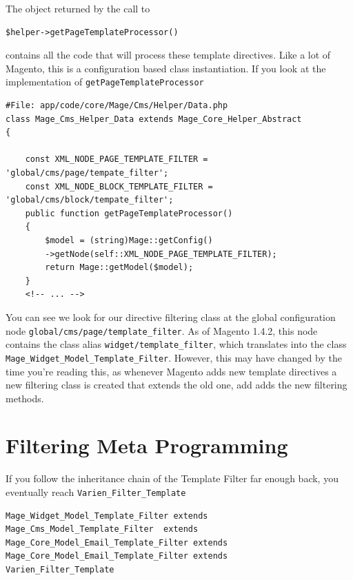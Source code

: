 \documentclass[oneside]{book}
\begin{document}
The object returned by the call to

\begin{lstlisting}
$helper->getPageTemplateProcessor()

\end{lstlisting}


contains all the code that will process these template directives.  Like a lot of Magento, this is a configuration based class instantiation.  If you look at the implementation of \footnotesize\texttt{getPageTemplateProcessor} \normalsize

\begin{lstlisting}
#File: app/code/core/Mage/Cms/Helper/Data.php
class Mage_Cms_Helper_Data extends Mage_Core_Helper_Abstract
{

    const XML_NODE_PAGE_TEMPLATE_FILTER = 'global/cms/page/tempate_filter';
    const XML_NODE_BLOCK_TEMPLATE_FILTER = 'global/cms/block/tempate_filter';
    public function getPageTemplateProcessor()
    {
        $model = (string)Mage::getConfig()
        ->getNode(self::XML_NODE_PAGE_TEMPLATE_FILTER);
        return Mage::getModel($model);
    }
    <!-- ... -->

\end{lstlisting}


You can see we look for our directive filtering class at the global configuration node \footnotesize\texttt{global/cms/page/template\_filter}\normalsize.  As of Magento 1.4.2, this node contains the class alias \footnotesize\texttt{widget/template\_filter}\normalsize, which translates into the class \footnotesize\texttt{Mage\_Widget\_Model\_Template\_Filter}\normalsize.  However, this may have changed by the time you're reading this, as whenever Magento adds new template directives a new filtering class is created that extends the old one, add adds the new filtering methods.

\section{Filtering Meta Programming}

If you follow the inheritance chain of the Template Filter far enough back, you eventually reach \footnotesize\texttt{Varien\_Filter\_Template} \normalsize

\begin{lstlisting}
Mage_Widget_Model_Template_Filter extends
Mage_Cms_Model_Template_Filter  extends
Mage_Core_Model_Email_Template_Filter extends
Mage_Core_Model_Email_Template_Filter extends
Varien_Filter_Template

\end{lstlisting}
\end{document}
